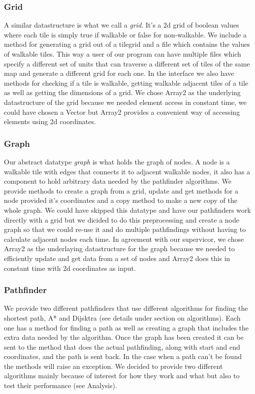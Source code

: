 \documentclass[12pt, a4paper]{article}
\begin{document}
\subsubsection{Grid}

A similar datastructure is what we call a \textit{grid}. It's a 2d grid of boolean values where each tile is simply true if walkable or false for non-walkable. We include a method for generating a grid out of a tilegrid and a file which contains the values of walkable tiles. This way a user of our program can have multiple files which specify a different set of units that can traverse a different set of tiles of the same map and generate a different grid for each one. In the interface we also have methods for checking if a tile is walkable, getting walkable adjacent tiles of a tile as well as getting the dimensions of a grid. We chose Array2 as the underlying datastructure of the grid because we needed element access in constant time, we could have chosen a Vector but Array2 provides a convenient way of accessing elements using 2d coordinates. 

\subsubsection{Graph}
Our abstract datatype \textit{graph} is what holds the graph of nodes. A node is a walkable tile with edges that connects it to adjacent walkable nodes, it also has a component to hold arbitrary data needed by the pathfinder algorithms. We provide methods to create a graph from a grid, update and get methods for a node provided it's coordinates and a copy method to make a new copy of the whole graph. We could have skipped this datatype and have our pathfinders work directly with a grid but we dicided to do this preprocessing and create a node graph so that we could re-use it and do multiple pathfindings without having to calculate adjacent nodes each time. In agreement with our supervicor, we chose Array2 as the underlaying datastructure for the graph because we needed to efficiently update and get data from a set of nodes and Array2 does this in constant time with 2d coordinates as input.

\subsubsection{Pathfinder}
We provide two different pathfinders that use different algorithms for finding the shortest path, A* and Dijsktra (see details under section on algorithms). Each one has a method for finding a path as well as creating a graph that includes the extra data needed by the algorithm. Once the graph has been created it can be sent to the method that does the actual pathfinding, along with start and end coordinates, and the path is sent back. In the case when a path can't be found the methods will raise an exception. We decided to provide two different algorithms mainly because of interest for how they work and what but also to test their performance (see Analysis).
\end{document}
